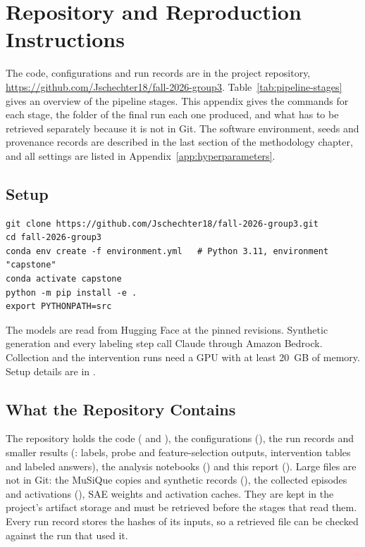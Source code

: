 \chapter{Repository and Reproduction Instructions}
\label{app:reproducibility}
\begingroup\raggedright

The code, configurations and run records are in the project repository,
\url{https://github.com/Jschechter18/fall-2026-group3}. Table~\ref{tab:pipeline-stages}
gives an overview of the pipeline stages. This appendix gives the commands for
each stage, the folder of the final run each one produced, and what has to be
retrieved separately because it is not in Git. The software environment,
seeds and provenance records are described in the last section of the
methodology chapter, and all settings are listed in
Appendix~\ref{app:hyperparameters}.

\section{Setup}

{\footnotesize
\begin{verbatim}
git clone https://github.com/Jschechter18/fall-2026-group3.git
cd fall-2026-group3
conda env create -f environment.yml   # Python 3.11, environment "capstone"
conda activate capstone
python -m pip install -e .
export PYTHONPATH=src
\end{verbatim}
}

The models are read from Hugging Face at the pinned revisions. Synthetic
generation and every labeling step call Claude through Amazon Bedrock.
Collection and the intervention runs need a GPU with at least 20~GB of memory.
Setup details are in .

\section{What the Repository Contains}

The repository holds the code ( and ), the
configurations (), the run records and smaller results
(: labels, probe and feature-selection outputs, intervention
tables and labeled answers), the analysis notebooks () and
this report (). Large files are not in Git: the
MuSiQue copies and synthetic records (), the collected episodes
and activations (), SAE weights
and activation caches. They are kept in the project's artifact storage and
must be retrieved before the stages that read them. Every run record stores
the hashes of its inputs, so a retrieved file can be checked against the run
that used it.

